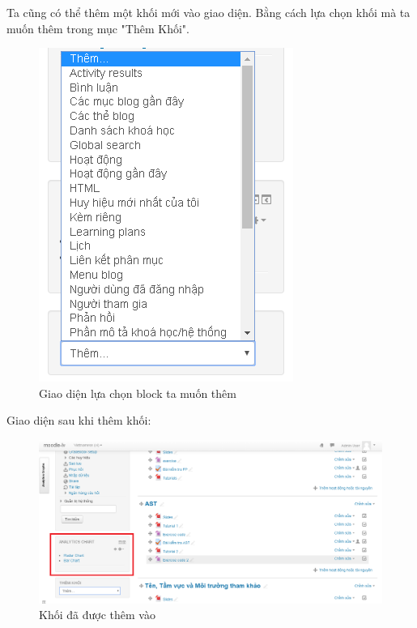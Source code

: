 Ta cũng có thể thêm một khối mới vào giao diện. Bằng cách lựa chọn khối mà ta muốn thêm trong mục "Thêm Khối".
\begin{center}
	\begin{figure}[htp]
		\begin{center}
			\includegraphics[scale=0.8]{img/addblock}
		\end{center}
		\caption{Giao diện lựa chọn block ta muốn thêm}
		\label{refhinh3}
	\end{figure}
\end{center}

\vskip 4cm
Giao diện sau khi thêm khối:
\begin{center}
	\begin{figure}[htp]
		\begin{center}
			\includegraphics[scale=0.5]{img/block}
		\end{center}
		\caption{Khối đã được thêm vào}
		\label{refhinh4}
	\end{figure}
\end{center}

